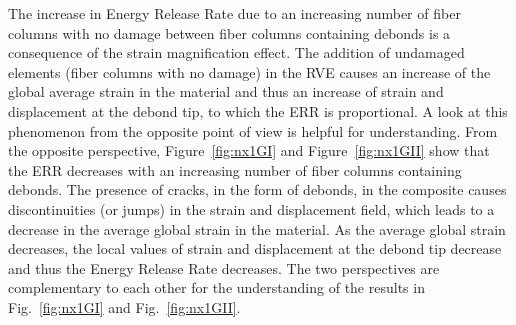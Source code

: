 \documentclass[smallextended]{svjour3}       %
\begin{document}
The increase in Energy Release Rate due to an increasing number of fiber columns with no damage between fiber columns containing debonds is a consequence of the strain magnification effect. The addition of undamaged elements (fiber columns with no damage) in the RVE causes an increase of the global average strain in the material and thus an increase of strain and displacement at the debond tip, to which the ERR is proportional. A look at this phenomenon from the opposite point of view is helpful for understanding. From the opposite perspective, Figure~\ref{fig:nx1GI} and Figure~\ref{fig:nx1GII} show that the ERR decreases with an increasing number of fiber columns containing debonds. The presence of cracks, in the form of debonds, in the composite causes discontinuities (or jumps) in the strain and displacement field, which leads to a decrease in the average global strain in the material. As the average global strain decreases, the local values of strain and displacement at the debond tip decrease and thus the Energy Release Rate decreases. The two perspectives are complementary to each other for the understanding of the results in Fig.~\ref{fig:nx1GI} and Fig.~\ref{fig:nx1GII}.\\
\end{document}
